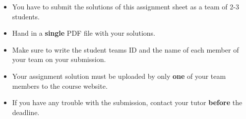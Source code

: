 \begin{itemize}
    \item You have to submit the solutions of this assignment sheet as a team of 2-3 students.
    \item  Hand in a \textbf{single} PDF file with your solutions.
    \item Make sure to write the student teams ID and the name of each
    member of your team on your submission.
    \item Your assignment solution must be uploaded by only \textbf{one} of your team members to the course website.
    \item If you have any trouble with the submission, contact your tutor \textbf{before} the deadline.
\end{itemize}


